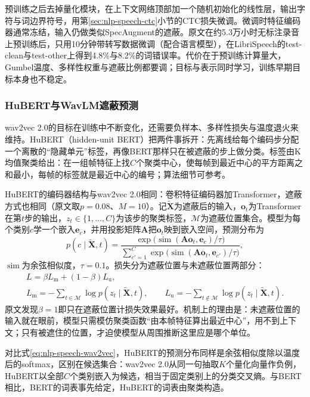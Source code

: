 预训练之后去掉量化模块，在上下文网络顶部加一个随机初始化的线性层，输出字符与词边界符号，用第\ref{sec:nlp-speech-ctc}小节的CTC损失微调。微调时特征编码器通常冻结，输入仍做类似SpecAugment的遮蔽。原文在约5.3万小时无标注录音上预训练后，只用10分钟带转写数据微调（配合语言模型），在LibriSpeech的test-clean与test-other上得到4.8\%与8.2\%的词错误率。代价在于预训练计算量大，Gumbel温度、多样性权重与遮蔽比例都要调；目标与表示同时学习，训练早期目标本身也不稳定。

\subsubsection{HuBERT与WavLM遮蔽预测}
\label{sec:nlp-speech-hubert}

wav2vec 2.0的目标在训练中不断变化，还需要负样本、多样性损失与温度退火来维持。HuBERT（hidden-unit BERT）把两件事拆开：先离线给每个编码步分配一个离散的“隐藏单元”标签，再像BERT那样只在被遮蔽的步上做分类。标签由K均值聚类给出：在一组帧特征上找$C$个聚类中心，使每帧到最近中心的平方距离之和最小，每帧的标签就是最近中心的编号；算法细节可参考。

HuBERT的编码器结构与wav2vec 2.0相同：卷积特征编码器加Transformer，遮蔽方式也相同（原文取$p=0.08$、$M=10$）。记$\tilde{\bm X}$为遮蔽后的输入，$\bm o_t$为Transformer在第$t$步的输出，$z_t\in\{1,\ldots,C\}$为该步的聚类标签，$\mathcal M$为遮蔽位置集合。模型为每个类别$c$学一个嵌入$\bm e_c$，并用投影矩阵$\bm A$把$\bm o_t$映到嵌入空间，预测分布为
\[
 p(c\mid\tilde{\bm X},t)=\frac{\exp\bigl(\operatorname{sim}(\bm A\bm o_t,\bm e_c)/\tau\bigr)}{\sum_{c'=1}^{C}\exp\bigl(\operatorname{sim}(\bm A\bm o_t,\bm e_{c'})/\tau\bigr)},
\]
$\operatorname{sim}$为余弦相似度，$\tau=0.1$。损失分为遮蔽位置与未遮蔽位置两部分：
\begin{equation}
 \begin{gathered}
 L=\beta L_{\mathrm m}+(1-\beta)L_{\mathrm u},\\
 L_{\mathrm m}=-\sum_{t\in\mathcal M}\log p(z_t\mid\tilde{\bm X},t),\qquad
 L_{\mathrm u}=-\sum_{t\notin\mathcal M}\log p(z_t\mid\tilde{\bm X},t).
 \end{gathered}
 \label{eq:nlp-speech-hubert}
\end{equation}
原文发现$\beta=1$即只在遮蔽位置计损失效果最好。机制上的理由是：未遮蔽位置的输入就在眼前，模型只需模仿聚类函数“由本帧特征算出最近中心”，用不到上下文；只有被遮住的位置，才迫使模型从周围推断这里应是哪个单位。

对比式\eqref{eq:nlp-speech-wav2vec}，HuBERT的预测分布同样是余弦相似度除以温度后的softmax，区别在候选集合：wav2vec 2.0从同一句抽取$K$个量化向量作负例，HuBERT以全部$C$个类别嵌入为候选，相当于固定类别上的分类交叉熵。与BERT相比，BERT的词表事先给定，HuBERT的词表由聚类构造。

